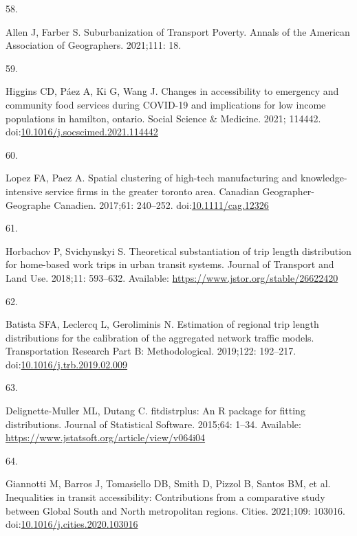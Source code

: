 \documentclass[10pt,letterpaper]{article}
\newlength{\cslhangindent}
\newlength{\csllabelwidth}
\newlength{\cslentryspacingunit} %
\newenvironment{CSLReferences}[2] %
 {%
  \setlength{\parindent}{0pt}
  \ifodd #1
  \let\oldpar\par
  \def\par{\hangindent=\cslhangindent\oldpar}
  \fi
  \setlength{\parskip}{#2\cslentryspacingunit}
 }%
 {}
\newcommand{\CSLLeftMargin}[1]{\parbox[t]{\csllabelwidth}{#1}}
\newcommand{\CSLRightInline}[1]{\parbox[t]{\linewidth - \csllabelwidth}{#1}\break}
\begin{document}
\begin{CSLReferences}{0}{0}
\leavevmode{}%
\CSLLeftMargin{58. }%
\CSLRightInline{Allen J, Farber S. Suburbanization of {Transport}
{Poverty}. Annals of the American Association of Geographers. 2021;111:
18. }

\leavevmode{}%
\CSLLeftMargin{59. }%
\CSLRightInline{Higgins CD, Páez A, Ki G, Wang J. Changes in
accessibility to emergency and community food services during COVID-19
and implications for low income populations in hamilton, ontario. Social
Science \& Medicine. 2021; 114442.
doi:\href{https://doi.org/10.1016/j.socscimed.2021.114442}{10.1016/j.socscimed.2021.114442}}

\leavevmode{}%
\CSLLeftMargin{60. }%
\CSLRightInline{Lopez FA, Paez A. Spatial clustering of high-tech
manufacturing and knowledge-intensive service firms in the greater
toronto area. Canadian Geographer-Geographe Canadien. 2017;61: 240--252.
doi:\href{https://doi.org/10.1111/cag.12326}{10.1111/cag.12326}}

\leavevmode{}%
\CSLLeftMargin{61. }%
\CSLRightInline{Horbachov P, Svichynskyi S. Theoretical substantiation
of trip length distribution for home-based work trips in urban transit
systems. Journal of Transport and Land Use. 2018;11: 593--632.
Available: \url{https://www.jstor.org/stable/26622420}}

\leavevmode{}%
\CSLLeftMargin{62. }%
\CSLRightInline{Batista SFA, Leclercq L, Geroliminis N. Estimation of
regional trip length distributions for the calibration of the aggregated
network traffic models. Transportation Research Part B: Methodological.
2019;122: 192--217.
doi:\href{https://doi.org/10.1016/j.trb.2019.02.009}{10.1016/j.trb.2019.02.009}}

\leavevmode{}%
\CSLLeftMargin{63. }%
\CSLRightInline{Delignette-Muller ML, Dutang C. {fitdistrplus}: An {R}
package for fitting distributions. Journal of Statistical Software.
2015;64: 1--34. Available:
\url{https://www.jstatsoft.org/article/view/v064i04}}

\leavevmode{}%
\CSLLeftMargin{64. }%
\CSLRightInline{Giannotti M, Barros J, Tomasiello DB, Smith D, Pizzol B,
Santos BM, et al. Inequalities in transit accessibility: {Contributions}
from a comparative study between {Global} {South} and {North}
metropolitan regions. Cities. 2021;109: 103016.
doi:\href{https://doi.org/10.1016/j.cities.2020.103016}{10.1016/j.cities.2020.103016}}


\end{CSLReferences}
\end{document}
